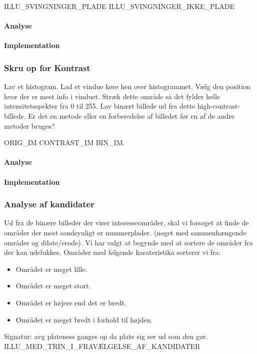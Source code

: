ILLU\_SVINGNINGER\_PLADE ILLU\_SVINGNINGER\_IKKE\_PLADE

\paragraph*{Analyse}
\paragraph*{Implementation}


\subsubsection*{Skru op for Kontrast}
Lav et histogram. Lad et vindue køre hen over histogrammet. Vælg den position hvor der er mest info i vinduet. Stræk dette område så det fylder helle intensitetsspekter fra 0 til 255. Lav binært billede ud fra dette high-contrast-billede. Er det en metode eller en forberedelse af billedet før en af de andre metoder bruges?

ORIG\_IM CONTRAST\_IM BIN\_IM.

\paragraph*{Analyse}
\paragraph*{Implementation}

\subsubsection*{Analyse af kandidater}
\label{sec_kandidater}
Ud fra de binære billeder der viser interesseområder, skal vi forsøget at finde de områder der mest sandsynligt er nummerplader. (noget med sammenhængende områder og dilate/erode). Vi har valgt at begynde med at sortere de områder fra der kan udelukkes. Områder med følgende karateristika sorterer vi fra:
\begin{itemize}
\item Området er meget lille.
\item Området er meget stort.
\item Området er højere end det er bredt.
\item Området er meget bredt i forhold til højden.
\
\end{itemize}

Signatur: avg plateness ganges op da plate sig ser ud som den gør.
ILLU_MED_TRIN_I_FRAVÆLGELSE_AF_KANDIDATER
